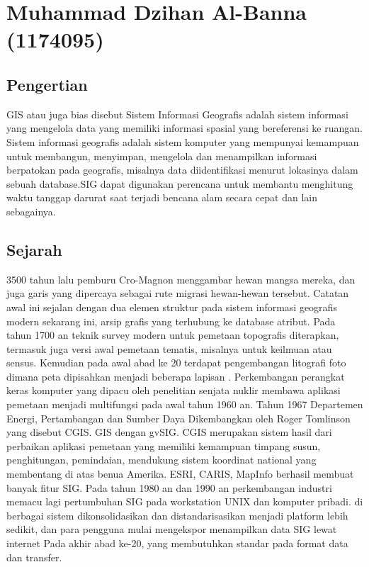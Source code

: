 \section{Muhammad Dzihan Al-Banna (1174095)}
\subsection{Pengertian}
GIS atau juga bias disebut Sistem Informasi Geografis adalah sistem informasi yang mengelola data yang memiliki informasi spasial yang bereferensi ke ruangan. Sistem informasi geografis adalah sistem komputer yang mempunyai kemampuan untuk membangun, menyimpan, mengelola dan menampilkan informasi berpatokan pada geografis, misalnya data diidentifikasi menurut lokasinya dalam sebuah database.SIG dapat digunakan perencana untuk membantu menghitung waktu tanggap darurat saat terjadi bencana alam secara cepat dan lain sebagainya.
\subsection{Sejarah}
3500 tahun lalu pemburu Cro-Magnon menggambar hewan mangsa mereka, dan juga garis yang dipercaya sebagai rute migrasi hewan-hewan tersebut. Catatan awal ini sejalan dengan dua elemen struktur pada sistem informasi geografis modern sekarang ini, arsip grafis yang terhubung ke database atribut.
Pada tahun 1700 an teknik survey modern untuk pemetaan topografis diterapkan, termasuk juga versi awal pemetaan tematis, misalnya untuk keilmuan atau sensus.
Kemudian pada awal abad ke 20 terdapat pengembangan litografi foto dimana peta dipisahkan menjadi beberapa lapisan . Perkembangan perangkat keras komputer yang dipacu oleh penelitian senjata nuklir membawa aplikasi pemetaan menjadi multifungsi pada awal tahun 1960 an.
Tahun 1967 Departemen Energi, Pertambangan dan Sumber Daya Dikembangkan oleh Roger Tomlinson yang disebut CGIS.
GIS dengan gvSIG.
CGIS merupakan sistem hasil dari perbaikan aplikasi pemetaan yang memiliki kemampuan timpang susun, penghitungan, pemindaian, mendukung sistem koordinat national yang membentang di atas benua Amerika. ESRI, CARIS,  MapInfo berhasil membuat banyak fitur SIG. Pada tahun 1980 an dan 1990 an perkembangan industri memacu lagi pertumbuhan SIG pada workstation UNIX dan komputer pribadi. di berbagai sistem dikonsolidasikan dan distandarisasikan menjadi platform lebih sedikit, dan para pengguna mulai mengekspor menampilkan data SIG lewat internet Pada akhir abad ke-20, yang membutuhkan standar pada format data dan transfer.

